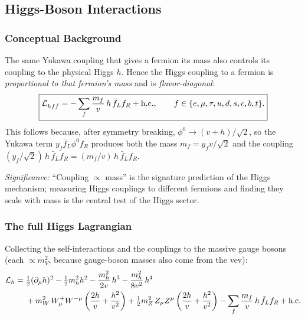 
\subsection{Higgs-Boson Interactions}\label{subsec:lec21:higgs}

\subsubsection*{Conceptual Background}

The same Yukawa coupling that gives a fermion its mass also controls its
coupling to the physical Higgs $h$. Hence the Higgs coupling to a
fermion is \emph{proportional to that fermion's mass} and is
\emph{flavor-diagonal}:
\begin{equation}
  \boxed{
    \mathcal{L}_{hf\bar f}
    = -\sum_f \frac{m_f}{v}\,h\,\bar f_L f_R + \text{h.c.},
    \qquad f\in\{e,\mu,\tau,u,d,s,c,b,t\}.
  }
  \label{eq:lec21:hff}
\end{equation}
This follows because, after symmetry breaking,
$\phi^0 \to (v+h)/\sqrt2$, so the Yukawa term $y_f\bar f_L\phi^0 f_R$
produces both the mass $m_f=y_f v/\sqrt2$ and the coupling
$(y_f/\sqrt2)\,h\,\bar f_L f_R = (m_f/v)\,h\,\bar f_L f_R$.

\textit{Significance:} ``Coupling $\propto$ mass'' is the signature
prediction of the Higgs mechanism; measuring Higgs couplings to
different fermions and finding they scale with mass is the central test
of the Higgs sector.

\subsubsection*{The full Higgs Lagrangian}

Collecting the self-interactions and the couplings to the massive gauge
bosons (each $\propto m_V^2$, because gauge-boson masses also come from
the vev):
\begin{equation}
  \begin{aligned}
    \mathcal{L}_h
    ={}& \tfrac12(\partial_\mu h)^2 - \tfrac12 m_h^2 h^2
       - \frac{m_h^2}{2v}\,h^3 - \frac{m_h^2}{8v^2}\,h^4 \\
     &+ m_W^2\,W^+_\mu W^{-\mu}
        \left(\frac{2h}{v}+\frac{h^2}{v^2}\right)
      + \tfrac12 m_Z^2\,Z_\mu Z^{\mu}
        \left(\frac{2h}{v}+\frac{h^2}{v^2}\right)
      - \sum_f \frac{m_f}{v}\,h\,\bar f_L f_R + \text{h.c.}
  \end{aligned}
  \label{eq:lec21:higgs-lagr}
\end{equation}

